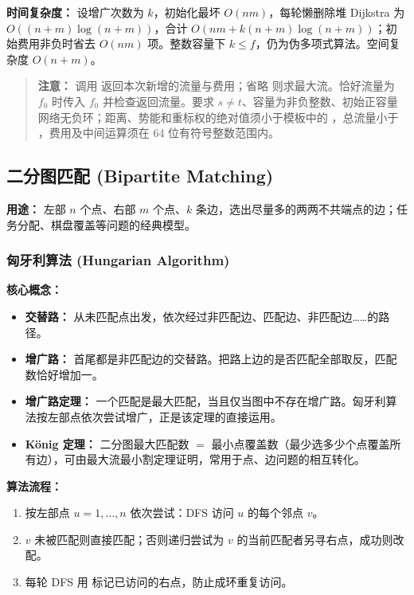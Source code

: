 \textbf{时间复杂度：} 设增广次数为 $k$，初始化最坏 $O(nm)$，每轮懒删除堆 Dijkstra 为 $O((n+m)\log(n+m))$，合计 $O(nm+k(n+m)\log(n+m))$；初始费用非负时省去 $O(nm)$ 项。整数容量下 $k\le f$，仍为伪多项式算法。空间复杂度 $O(n+m)$。

\begin{quote}
\textbf{注意：} 调用  返回本次新增的流量与费用；省略  则求最大流。恰好流量为 $f_0$ 时传入 $f_0$ 并检查返回流量。要求 $s\ne t$、容量为非负整数、初始正容量网络无负环；距离、势能和重标权的绝对值须小于模板中的 ，总流量小于 ，费用及中间运算须在 64 位有符号整数范围内。
\end{quote}



\subsection{二分图匹配 (Bipartite Matching)}

\textbf{用途：} 左部 $n$ 个点、右部 $m$ 个点、$k$ 条边，选出尽量多的两两不共端点的边；任务分配、棋盘覆盖等问题的经典模型。

\subsubsection{匈牙利算法 (Hungarian Algorithm)}

\textbf{核心概念：}
\begin{itemize}
  \item \textbf{交替路：} 从未匹配点出发，依次经过非匹配边、匹配边、非匹配边……的路径。
  \item \textbf{增广路：} 首尾都是非匹配边的交替路。把路上边的是否匹配全部取反，匹配数恰好增加一。
  \item \textbf{增广路定理：} 一个匹配是最大匹配，当且仅当图中不存在增广路。匈牙利算法按左部点依次尝试增广，正是该定理的直接运用。
  \item \textbf{König 定理：} 二分图最大匹配数 $=$ 最小点覆盖数（最少选多少个点覆盖所有边），可由最大流最小割定理证明，常用于点、边问题的相互转化。
\end{itemize}

\textbf{算法流程：}
\begin{enumerate}
  \item 按左部点 $u = 1, \dots, n$ 依次尝试：DFS 访问 $u$ 的每个邻点 $v$。
  \item $v$ 未被匹配则直接匹配；否则递归尝试为 $v$ 的当前匹配者另寻右点，成功则改配。
  \item 每轮 DFS 用  标记已访问的右点，防止成环重复访问。
\end{enumerate}


